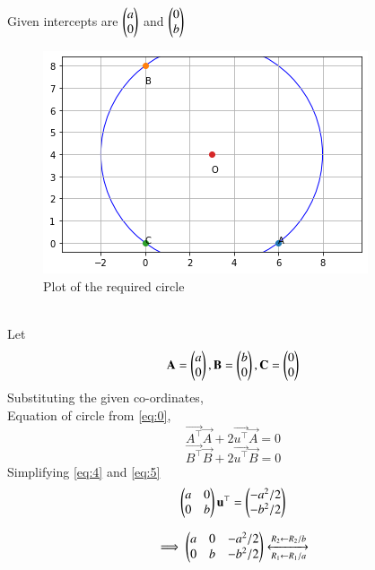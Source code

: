 \documentclass[journal,12pt,twocolumn]{IEEEtran}
\begin{document}
Given intercepts are $\begin{pmatrix}a\\0\end{pmatrix}$ and $\begin{pmatrix}0\\b\end{pmatrix}$ \\
\begin{figure}[!h]
         \centering
         \includegraphics[width=\columnwidth]{figure3.png}
         \caption{Plot of the required circle}
         \label{Figure}
\end{figure}\\

Let 
\begin{equation}
 \mathbf{A}=\begin{pmatrix}a\\0\end{pmatrix} ,\\
 \mathbf{B}=\begin{pmatrix}b\\0\end{pmatrix},\\
 \mathbf{C}=\begin{pmatrix}0\\0\end{pmatrix}
\end{equation}
Substituting the given co-ordinates,\\
Equation of circle from \eqref{eq:0},
\begin{equation}
    \vec{A^\top}\vec{A}+2\vec{u^\top}\vec{A}=0 \label{eq:4}
\end{equation}
\begin{equation}
    \vec{B^\top}\vec{B}+2\vec{u^\top}\vec{B}=0 \label{eq:5}
\end{equation}
Simplifying \eqref{eq:4} and \eqref{eq:5}
\begin{equation}
    \begin{pmatrix}a & 0 \\ 0 & b\end{pmatrix}\mathbf{u^\top}= \begin{pmatrix}-a^2/2 \\ -b^2/2\end{pmatrix}
\end{equation}

\begin{equation}
\implies \begin{pmatrix}a & 0 & -a^2/2 \\ 0 & b & -b^2/2\end{pmatrix}
\xleftrightarrow [R_1\leftarrow R_1/a]{R_2\leftarrow R_2/b}
\end{equation}
\end{document}
